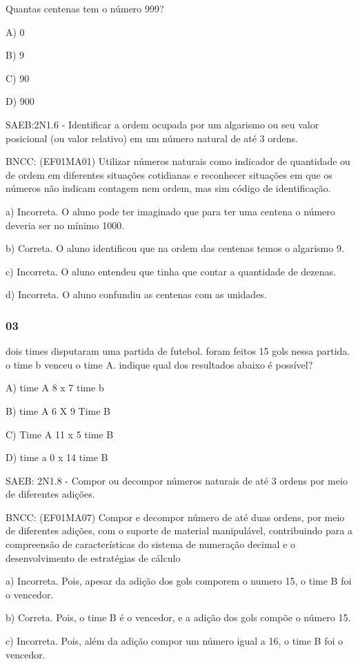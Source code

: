 Quantas centenas tem o número 999?

A) 0

B) 9

C) 90

D) 900

SAEB:2N1.6 - Identificar a ordem ocupada por um algarismo ou seu valor
posicional (ou valor relativo) em um número natural de até 3 ordens.

BNCC: (EF01MA01) Utilizar números naturais como indicador de quantidade
ou de ordem em diferentes situações cotidianas e reconhecer situações em
que os números não indicam contagem nem ordem, mas sim código de
identificação.

a) Incorreta. O aluno pode ter imaginado que para ter uma centena o
número deveria ser no mínimo 1000.

b) Correta. O aluno identificou que na ordem das centenas temos o
algarismo 9.

c) Incorreta. O aluno entendeu que tinha que contar a quantidade de
dezenas.

d) Incorreta. O aluno confundiu as centenas com as unidades.

\subsubsection{03}\label{section-119}

dois times disputaram uma partida de futebol. foram feitos 15 gols nessa
partida. o time b venceu o time A. indique qual dos resultados abaixo é
possível?

A) time A 8 x 7 time b

B) time A 6 X 9 Time B

C) Time A 11 x 5 time B

D) time a 0 x 14 time B

SAEB: 2N1.8 - Compor ou decompor números naturais de até 3 ordens por
meio de diferentes adições.

BNCC: (EF01MA07) Compor e decompor número de até duas ordens, por meio
de diferentes adições, com o suporte de material manipulável,
contribuindo para a compreensão de características do sistema de
numeração decimal e o desenvolvimento de estratégias de cálculo

a) Incorreta. Pois, apesar da adição dos gols comporem o numero 15, o
time B foi o vencedor.

b) Correta. Pois, o time B é o vencedor, e a adição dos gols compõe o
número 15.

c) Incorreta. Pois, além da adição compor um número igual a 16, o time B
foi o vencedor.

